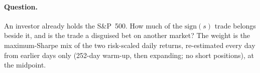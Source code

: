 \paragraph{Question.} An investor already holds the S\&P~500. How much of the
$\mathrm{sign}(s)$ trade belongs beside it, and is the trade a disguised bet
on another market? The weight is the maximum-Sharpe mix of the two
risk-scaled daily returns, re-estimated every day from earlier days only
(252-day warm-up, then expanding; no short positions), at the midpoint.

\begin{table}[H]
\centering
\caption{The trade beside the S\&P~500, \runappPwDays{} days from
\runappPwFirst{}. Correlations are those of the trade's daily return with the
S\&P~500 over the trade's own window (15:30 to the close), with the size of
that move, and close to close. The risk share is the trade's share of the risk
budget; the dollar column is the median premium held per \$100 of index. The
last column is the combination's Sharpe ratio minus that of the S\&P~500 alone
(\runappPwSpx{}).}
\label{tab:app_run_portfolio}
\runappfit{\small}
\end{table}

\begin{table}[H]
\centering
\caption{Correlation of the trade's daily return (midpoint, block-diagonal
ridge) with same-day moves of other markets, on the \runappHcNdays{} days
wherever both exist.}
\label{tab:app_run_comoves}
\runappfit{\small}
\end{table}

